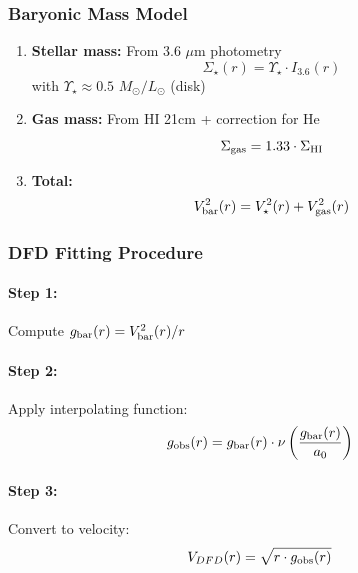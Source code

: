 \subsubsection{Baryonic Mass Model}

\begin{enumerate}
\item \textbf{Stellar mass:} From 3.6 $\mu$m photometry
   \begin{equation}
   \Sigma_\star(r) = \Upsilon_\star \cdot I_{3.6}(r)
   \end{equation}
   with $\Upsilon_\star \approx 0.5$ $M_\odot/L_\odot$ (disk)

\item \textbf{Gas mass:} From HI 21cm + correction for He
   \begin{equation}
   \Sigma_{\rm gas} = 1.33 \cdot \Sigma_{\rm HI}
   \end{equation}

\item \textbf{Total:}
   \begin{equation}
   V_{\rm bar}^2(r) = V_\star^2(r) + V_{\rm gas}^2(r)
   \end{equation}
\end{enumerate}

\subsubsection{DFD Fitting Procedure}

\paragraph{Step 1:} Compute $g_{\rm bar}(r) = V_{\rm bar}^2(r)/r$

\paragraph{Step 2:} Apply interpolating function:
\begin{equation}
g_{\rm obs}(r) = g_{\rm bar}(r) \cdot \nu\left(\frac{g_{\rm bar}(r)}{a_0}\right)
\end{equation}

\paragraph{Step 3:} Convert to velocity:
\begin{equation}
V_{DFD}(r) = \sqrt{r \cdot g_{\rm obs}(r)}
\end{equation}

